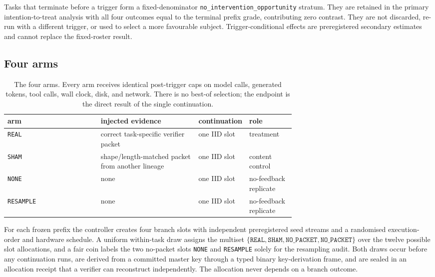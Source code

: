 \documentclass{article}
\begin{document}
Tasks that terminate before a trigger form a fixed-denominator
\texttt{no\_intervention\_opportunity} stratum. They are retained in the primary
intention-to-treat analysis with all four outcomes equal to the terminal prefix
grade, contributing zero contrast. They are not discarded, re-run with a
different trigger, or used to select a more favourable subject.
Trigger-conditional effects are preregistered secondary estimates and cannot
replace the fixed-roster result.

\subsection{Four arms}

\begin{table}[t]
\centering
\small
\caption{The four arms. Every arm receives identical post-trigger caps on model
calls, generated tokens, tool calls, wall clock, disk, and network. There is no
best-of selection; the endpoint is the direct result of the single
continuation.}
\label{tab:arms}
\begin{tabular}{@{}lp{0.34\linewidth}p{0.17\linewidth}p{0.16\linewidth}@{}}
\toprule
arm & injected evidence & continuation & role \\
\midrule
\texttt{REAL}     & correct task-specific verifier packet & one IID slot & treatment \\
\texttt{SHAM}     & shape/length-matched packet from another lineage & one IID slot & content control \\
\texttt{NONE}     & none & one IID slot & no-feedback replicate \\
\texttt{RESAMPLE} & none & one IID slot & no-feedback replicate \\
\bottomrule
\end{tabular}
\end{table}

For each frozen prefix the controller creates four branch slots with
independent preregistered seed streams and a randomised execution-order and
hardware schedule. A uniform within-task draw assigns the multiset
$\{\texttt{REAL}, \texttt{SHAM}, \texttt{NO\_PACKET}, \texttt{NO\_PACKET}\}$
over the twelve possible slot allocations, and a fair coin labels the two
no-packet slots \texttt{NONE} and \texttt{RESAMPLE} solely for the resampling
audit. Both draws occur before any continuation runs, are derived from a
committed master key through a typed binary key-derivation frame, and are
sealed in an allocation receipt that a verifier can reconstruct independently.
The allocation never depends on a branch outcome.
\end{document}
